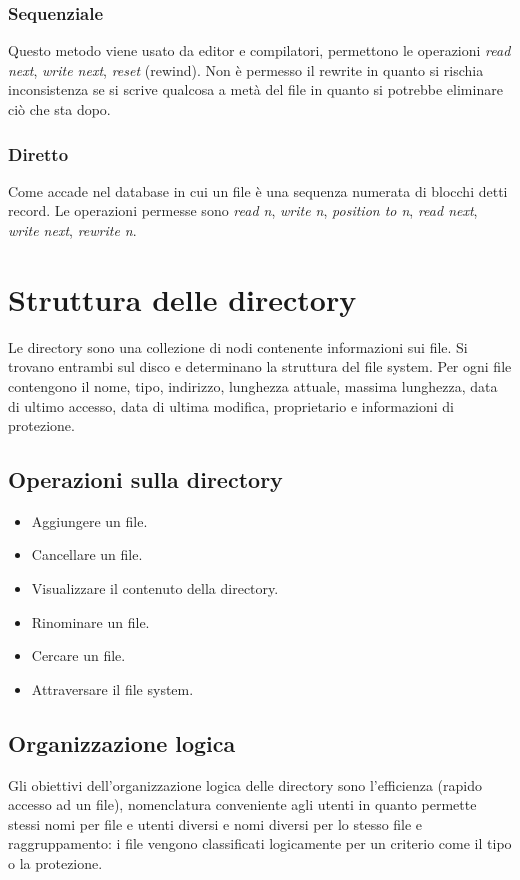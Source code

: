 \subsubsection{Sequenziale}
Questo metodo viene usato da editor e compilatori, permettono le operazioni \emph{read next}, \emph{write next}, \emph{reset} (rewind). Non \`e permesso il rewrite in quanto si rischia
inconsistenza se si scrive qualcosa a met\`a del file in quanto si potrebbe eliminare ci\`o che sta dopo. 
\subsubsection{Diretto}
Come accade nel database in cui un file \`e una sequenza numerata di blocchi detti record. Le operazioni permesse sono \emph{read n}, \emph{write n}, \emph{position to n}, \emph{read
next}, \emph{write next}, \emph{rewrite n}. 
\section{Struttura delle directory}
Le directory sono una collezione di nodi contenente informazioni sui file. Si trovano entrambi sul disco e determinano la struttura del file system. Per ogni file contengono il 
nome, tipo, indirizzo, lunghezza attuale, massima lunghezza, data di ultimo accesso, data di ultima modifica, proprietario e informazioni di protezione. 
\subsection{Operazioni sulla directory}
\begin{itemize}
	\item Aggiungere un file.
	\item Cancellare un file.
	\item Visualizzare il contenuto della directory.
	\item Rinominare un file.
	\item Cercare un file.
	\item Attraversare il file system. 
\end{itemize}
\subsection{Organizzazione logica}
Gli obiettivi dell'organizzazione logica delle directory sono l'efficienza (rapido accesso ad un file), nomenclatura conveniente agli utenti in quanto permette stessi nomi per file
e utenti diversi e nomi diversi per lo stesso file e raggruppamento: i file vengono classificati logicamente per un criterio come il tipo o la protezione. 
